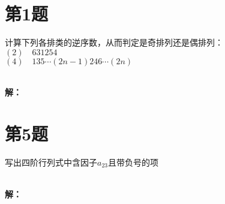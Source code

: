 \documentclass[a4paper, 12pt]{ctexart}
\begin{document}
\makeHomeworkTitle


\section{第1题}

\begin{exercise}
    计算下列各排类的逆序数，从而判定是奇排列还是偶排列：\\
    
    $(2) \quad 631254$ \\
    
     $(4) \quad 135 \cdots (2n-1)246 \cdots (2n)$
\end{exercise}~\\

\noindent\textbf{解：}


\section{第5题}
\begin{exercise}
写出四阶行列式中含因子$a_{23}$且带负号的项

\end{exercise}~\\
\noindent\textbf{解：}
\end{document}

